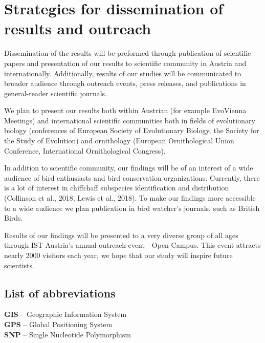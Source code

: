 \documentclass[11pt,a4paper]{article}
\begin{document}
\section{Strategies for dissemination of results and outreach}

Dissemination of the results will be preformed through publication of scientific papers and presentation of our results to scientific community in Austria and internationally. Additionally, results of our studies will be communicated to broader audience through outreach events, press releases, and publications in general-reader scientific journals.

We plan to present our results both within Austrian (for example EvoVienna Meetings) and international scientific communities both in fields of evolutionary biology (conferences of European Society of Evolutionary Biology, the Society for the Study of Evolution) and ornithology (European Ornithological Union Conference, International Ornithological Congress). 

In addition to scientific community, our findings will be of an interest of a wide audience of bird enthusiasts and bird conservation organizations. Currently, there is a lot of interest in chiffchaff subspecies identification and distribution (Collinson et al., 2018, Lewis et al., 2018). To make our findings more accessible to a wide audience we plan publication in bird watcher's journals, such as British Birds. 

Results of our findings will be presented to a very diverse group of all ages through IST Austria's annual outreach event - Open Campus. This event attracts nearly 2000 visitors each year, we hope that our study will inspire future scientists.



\makeatletter
\newcommand{\adjustmybblparameters}{\setlength{\itemsep}{0\baselineskip}\setlength{\parsep}{0pt}}
\let\ORIGINALlatex@openbib@code=\@openbib@code
\renewcommand{\@openbib@code}{\ORIGINALlatex@openbib@code\adjustmybblparameters}
\makeatother
%
%

\subsection{List of abbreviations}
\textbf{GIS} -- Geographic Information System \\
\textbf{GPS} -- Global Positioning System\\
\textbf{SNP} -- Single Nucleotide Polymorphism\\
\end{document}
